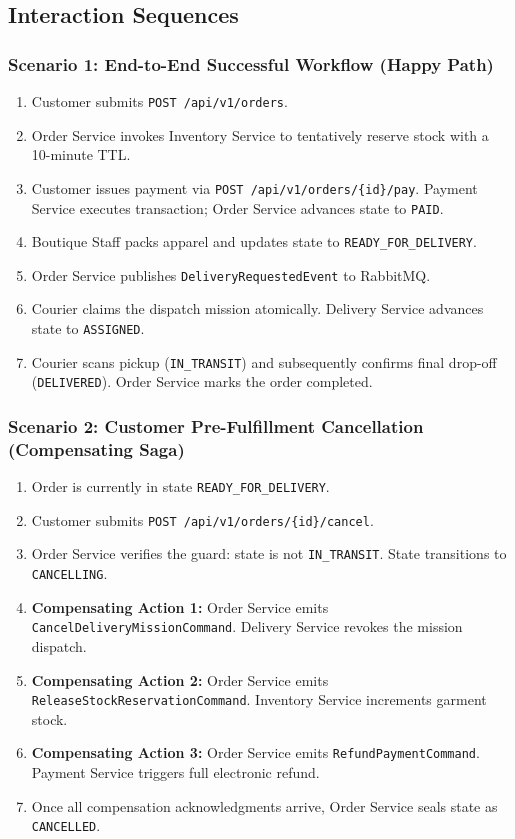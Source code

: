 \documentclass[11pt,a4paper]{article}
\begin{document}
\subsection{Interaction Sequences}

\subsubsection{Scenario 1: End-to-End Successful Workflow (Happy Path)}
\begin{enumerate}[noitemsep]
    \item Customer submits \texttt{POST /api/v1/orders}.
    \item Order Service invokes Inventory Service to tentatively reserve stock with a 10-minute TTL.
    \item Customer issues payment via \texttt{POST /api/v1/orders/\{id\}/pay}. Payment Service executes transaction; Order Service advances state to \texttt{PAID}.
    \item Boutique Staff packs apparel and updates state to \texttt{READY\_FOR\_DELIVERY}.
    \item Order Service publishes \texttt{DeliveryRequestedEvent} to RabbitMQ.
    \item Courier claims the dispatch mission atomically. Delivery Service advances state to \texttt{ASSIGNED}.
    \item Courier scans pickup (\texttt{IN\_TRANSIT}) and subsequently confirms final drop-off (\texttt{DELIVERED}). Order Service marks the order completed.
\end{enumerate}

\subsubsection{Scenario 2: Customer Pre-Fulfillment Cancellation (Compensating Saga)}
\begin{enumerate}[noitemsep]
    \item Order is currently in state \texttt{READY\_FOR\_DELIVERY}.
    \item Customer submits \texttt{POST /api/v1/orders/\{id\}/cancel}.
    \item Order Service verifies the guard: state is not \texttt{IN\_TRANSIT}. State transitions to \texttt{CANCELLING}.
    \item \textbf{Compensating Action 1:} Order Service emits \texttt{CancelDeliveryMissionCommand}. Delivery Service revokes the mission dispatch.
    \item \textbf{Compensating Action 2:} Order Service emits \texttt{ReleaseStockReservationCommand}. Inventory Service increments garment stock.
    \item \textbf{Compensating Action 3:} Order Service emits \texttt{RefundPaymentCommand}. Payment Service triggers full electronic refund.
    \item Once all compensation acknowledgments arrive, Order Service seals state as \texttt{CANCELLED}.
\end{enumerate}
\end{document}
